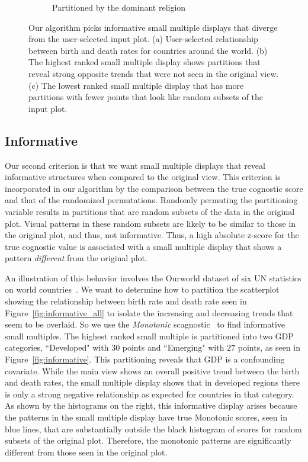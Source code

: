 \begin{figure}[t]
\begin{subfigure}{3in}
        \vspace{-0.5cm}
		  \caption{Partitioned by the dominant religion}
		 \label{fig:not_informative}
	 \end{subfigure}
	  \caption{Our algorithm picks informative small multiple displays that diverge from the user-selected input plot. (a) User-selected relationship between birth and death rates for countries around the world. (b) The highest ranked small multiple display shows partitions that reveal strong opposite trends that were not seen in the original view. (c) The lowest ranked small multiple display that has more partitions with fewer points that look like random subsets of the input plot.}
\end{figure}

\subsection{Informative}
Our second criterion is that we want small multiple displays that reveal informative structures when compared to the original view. This criterion is incorporated in our algorithm by the comparison between the true cognostic score and that of the randomized permutations. Randomly permuting the partitioning variable results in partitions that are random subsets of the data in the original plot. Visual patterns in these random subsets are likely to be similar to those in the original plot, and thus, not informative. Thus, a high absolute z-score for the true cognostic value is associated with a small multiple display that shows a pattern \emph{different} from the original plot.

An illustration of this behavior involves the Ourworld dataset of six UN statistics on world countries~\cite{Wilkinson2005GG}. We want to determine how to partition the scatterplot showing the relationship between birth rate and death rate seen in Figure~\ref{fig:informative_all} to isolate the increasing and decreasing trends that seem to be overlaid. So we use the \emph{Monotonic} scagnostic~\cite{Wilkinson2005} to find informative small multiples. The highest ranked small multiple is partitioned into two GDP categories, ``Developed" with $30$ points and ``Emerging" with $27$ points, as seen in Figure~\ref{fig:informative}. This partitioning reveals that GDP is a confounding covariate. While the main view shows an overall positive trend between the birth and death rates, the small multiple display shows that in developed regions there is only a strong negative relationship as expected for countries in that category. As shown by the histograms on the right, this informative display arises because the patterns in the small multiple display have true Monotonic scores, seen in blue lines, that are substantially outside the black histogram of scores for random subsets of the original plot. Therefore, the monotonic patterns are significantly different from those seen in the original plot.

